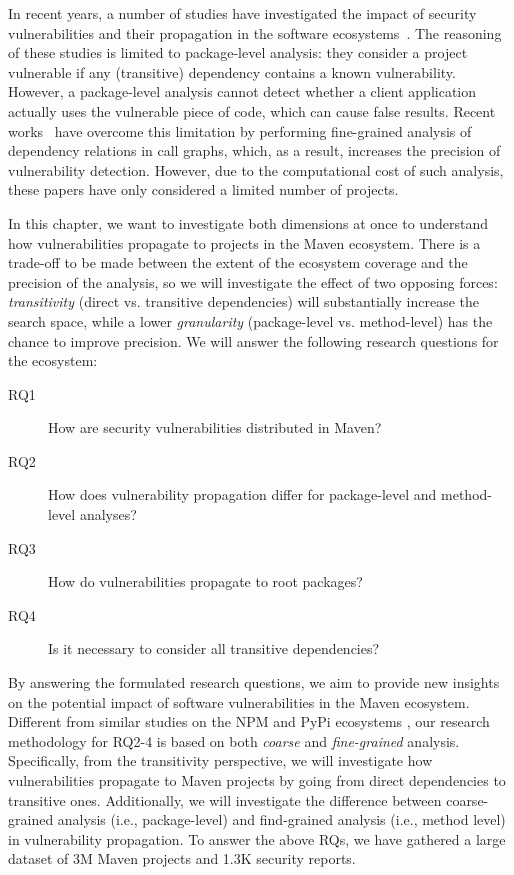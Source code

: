 In recent years, a number of studies have investigated the impact of security vulnerabilities and their propagation in the software ecosystems~\cite{decan2018impact,alfadel2021empirical,zimmermann2019small,liu2022demystifying}.
The reasoning of these studies is limited to package-level analysis: they consider a project vulnerable if any (transitive) dependency contains a known vulnerability.
However, a package-level analysis cannot detect whether a client application actually uses the vulnerable piece of code, which can cause false results.
Recent works~\cite{zapata2018towards, nielsen2021modular} have overcome this limitation by performing fine-grained analysis of dependency relations in call graphs, which, as a result, increases the precision of vulnerability detection.
However, due to the computational cost of such analysis, these papers have only considered a limited number of projects.

In this chapter, we want to investigate both dimensions at once to understand how vulnerabilities propagate to projects in the Maven ecosystem.
There is a trade-off to be made between the extent of the ecosystem coverage and the precision of the analysis, so we will investigate the effect of two opposing forces:
\emph{transitivity} (direct vs. transitive dependencies) will substantially increase the search space, while a lower \emph{granularity} (package-level vs. method-level) has the chance to improve precision.
We will answer the following research questions for the  ecosystem:

\begin{description}
\item[RQ1] How are security vulnerabilities distributed in Maven?
\item[RQ2] How does vulnerability propagation differ for package-level and method-level analyses?
\item[RQ3] How do vulnerabilities propagate to root packages?
\item[RQ4] Is it necessary to consider all transitive dependencies?
\end{description}

By answering the formulated research questions, we aim to provide new insights on the potential impact of software vulnerabilities in the Maven ecosystem.
Different from similar studies on the NPM and PyPi ecosystems \cite{alfadel2021empirical, decan2018impact, liu2022demystifying}, our research methodology for RQ2-4 is based on both \textit{coarse} and \textit{fine-grained} analysis. Specifically, from the transitivity perspective, we will investigate how vulnerabilities propagate to Maven projects by going from direct dependencies to transitive ones.
Additionally, we will investigate the difference between coarse-grained analysis (i.e., package-level) and find-grained analysis (i.e., method level) in vulnerability propagation.
To answer the above RQs, we have gathered a large dataset of 3M Maven projects and 1.3K security reports.

